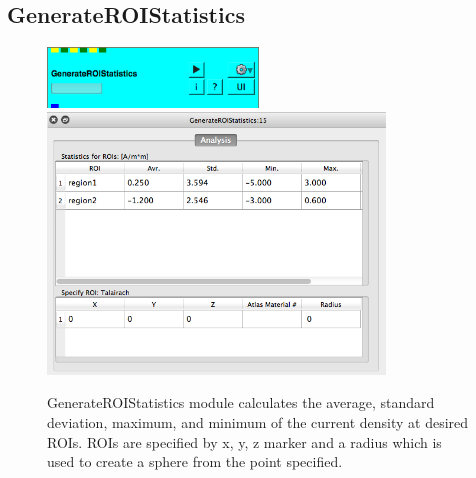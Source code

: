 \documentclass[fleqn,11pt,openany]{book}
\newcommand{\imgSm}{0.5}
\begin{document}
\subsection{GenerateROIStatistics}
\begin{figure}[!h]
	\centering
	\includegraphics[width=\imgSm\textwidth]{BrainStimulation_figures/generateroistatistics.png}
	\includegraphics[width=0.8\textwidth]{BrainStimulation_figures/generateroistatistics_GUI.png}
	\caption{GenerateROIStatistics module calculates the average, standard deviation, maximum, and minimum of the current density at desired ROIs. ROIs are specified by x, y, z marker and a radius which is used to create a sphere from the point specified.}
	\label{fig:gen_roi_statistics}
\end{figure}
\end{document}
